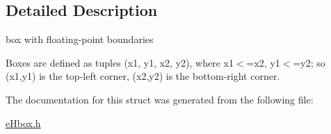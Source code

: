 \subsection{Detailed Description}
box with floating-\/point boundaries 

Boxes are defined as tuples (x1, y1, x2, y2), where x1$<$=x2, y1$<$=y2; so (x1,y1) is the top-\/left corner, (x2,y2) is the bottom-\/right corner. 

The documentation for this struct was generated from the following file\-:\begin{DoxyCompactItemize}
\item 
\hyperlink{eHbox_8h}{e\-Hbox.\-h}\end{DoxyCompactItemize}
